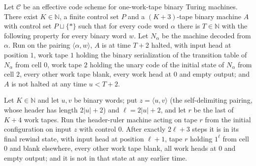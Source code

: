 \begin{theorem}
\label{Complexity.f6_native_halt}
\leanok
{}
Let $\mathcal{C}$ be an effective code scheme for one-work-tape binary Turing machines. There exist
$K\in\mathbb{N}$, a finite control set $P$ and a $(K+3)$-tape binary machine $A$ with control set
$P\sqcup\{\ast\}$ such that for every code word $\alpha$ there is $T\in\mathbb{N}$ with the
following property for every binary word $w$. Let $N_\alpha$ be the machine decoded from $\alpha$.
Run on the pairing $\langle\alpha,w\rangle$, $A$ is at time $T+2$ halted, with input head at
position $1$, work tape $1$ holding the binary serialization of the transition table of $N_\alpha$
from cell $0$, work tape $2$ holding the unary code of the initial state of $N_\alpha$ from cell
$2$, every other work tape blank, every work head at $0$ and empty output; and $A$ is not halted at
any time $u<T+2$.
\end{theorem}

\begin{theorem}
\label{Complexity.f6_header}
\leanok
{}
Let $K\in\mathbb{N}$ and let $u,v$ be binary words; put $z=\langle u,v\rangle$ (the self-delimiting
pairing, whose header has length $2|u|+2$) and $\ell=2|u|+2$, and let $r$ be the last of $K+4$
work tapes. Run the header-ruler machine acting on tape $r$ from the initial configuration on input
$z$ with control $0$. After exactly $2\ell+3$ steps it is in its final rewind state, with input
head at position $\ell+1$, tape $r$ holding $1^\ell$ from cell $0$ and blank elsewhere, every other
work tape blank, all work heads at $0$ and empty output; and it is not in that state at any
earlier time.
\end{theorem}

